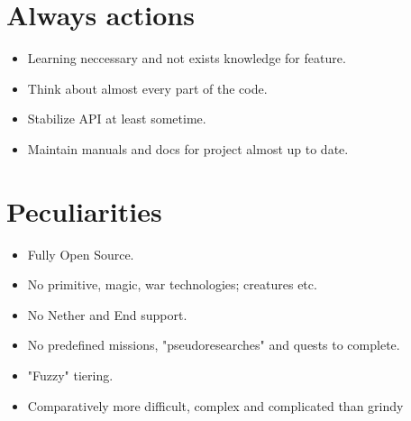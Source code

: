 \documentclass[12pt]{article}
\begin{document}
	\section{Always actions}

	\begin{itemize}
		\item Learning neccessary and not exists knowledge for feature.
		\item Think about almost every part of the code.
		\item Stabilize API at least sometime.
		\item Maintain manuals and docs for project almost up to date.
	\end{itemize}

	\section{Peculiarities}

	\begin{itemize}
		\item Fully Open Source.
		\item No primitive, magic, war technologies; creatures etc.
		\item No Nether and End support.
		\item No predefined missions, "pseudoresearches" and quests to complete.
		\item "Fuzzy" tiering.
		\item Comparatively more difficult, complex and complicated than grindy
	\end{itemize}
\end{document}
